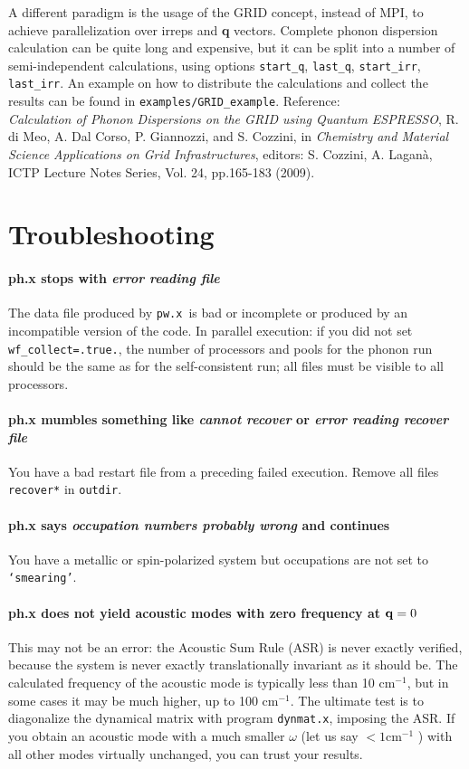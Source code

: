 \documentclass[12pt,a4paper]{article}
\def\pwx{\texttt{pw.x}}
\begin{document}
A different paradigm is the usage of the GRID concept, instead of MPI,
to achieve parallelization over irreps and  {\bf q} vectors.
Complete phonon dispersion calculation can be quite long and
expensive, but it can be split into a number of semi-independent
calculations, using options \texttt{start\_q}, \texttt{last\_q},
\texttt{start\_irr}, \texttt{last\_irr}. An example on how to
distribute the calculations and collect the results can be found
in \texttt{examples/GRID\_example}. Reference:\\
{\it Calculation of Phonon Dispersions on the GRID using Quantum
     ESPRESSO},
     R. di Meo, A. Dal Corso, P. Giannozzi, and S. Cozzini, in
     {\it Chemistry and Material Science Applications on Grid Infrastructures},
     editors: S. Cozzini, A. Lagan\`a, ICTP Lecture Notes Series,
     Vol. 24, pp.165-183 (2009).


\section{Troubleshooting}

\paragraph{ph.x stops with {\em error reading file}}
The data file produced by \pwx\ is bad or incomplete or produced
by an incompatible version of the code.
In parallel execution: if you did not set \texttt{wf\_collect=.true.}, the number
of processors and pools for the phonon run should be the same as for the
self-consistent run; all files must be visible to all processors.

\paragraph{ph.x mumbles something like {\em cannot recover} or {\em error
  reading recover file}} 
You have a bad restart file from a preceding failed execution.
Remove all files \texttt{recover*} in \texttt{outdir}.

\paragraph{ph.x says {\em occupation numbers probably wrong} and
 continues} You have a
metallic or spin-polarized system but occupations are not set to 
\texttt{`smearing'}.

\paragraph{ph.x does not yield acoustic modes with zero frequency at 
${\bf q}=0$}
This may not be an error: the Acoustic Sum Rule (ASR) is never exactly
verified, because the system is never exactly translationally
invariant as it should be.  The calculated frequency of the acoustic
mode is typically less than 10 cm$^{-1}$, but in some cases it may be
much higher, up to 100 cm$^{-1}$. The ultimate test is to diagonalize
the dynamical matrix with program \texttt{dynmat.x}, imposing the ASR. If you
obtain an acoustic mode with a much smaller $\omega$ (let us say 
$< 1 \mbox{cm}^{-1}$ ) 
with all other modes virtually unchanged, you can trust your results.
\end{document}
